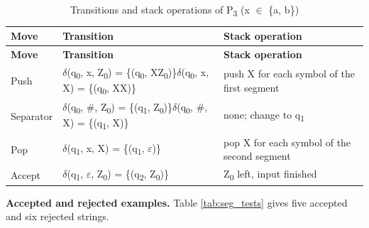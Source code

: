 \documentclass[12pt,a4paper]{article}
\begin{document}
{\footnotesize
\begin{longtable}{|>{\raggedright\arraybackslash}p{}|>{\raggedright\arraybackslash}p{}|>{\raggedright\arraybackslash}p{}|}
\caption[Transitions and stack operations of P3 (x \ensuremath{\in} \{a, b\})]{Transitions and stack operations of P\textsubscript{3} (x \ensuremath{\in} \{a, b\})}\label{tab:seg_delta}\\
\hline
\rowcolor{hdr}\textbf{Move} & \textbf{Transition} & \textbf{Stack operation}\\ \hline
\endfirsthead
\hline
\rowcolor{hdr}\textbf{Move} & \textbf{Transition} & \textbf{Stack operation}\\ \hline
\endhead
Push & \ensuremath{\delta}(q\textsubscript{0}, x, Z\textsubscript{0}) = \{(q\textsubscript{0}, XZ\textsubscript{0})\}\newline \ensuremath{\delta}(q\textsubscript{0}, x, X) = \{(q\textsubscript{0}, XX)\} & push X for each symbol of the first segment\\ \hline
Separator & \ensuremath{\delta}(q\textsubscript{0}, \#, Z\textsubscript{0}) = \{(q\textsubscript{1}, Z\textsubscript{0})\}\newline \ensuremath{\delta}(q\textsubscript{0}, \#, X) = \{(q\textsubscript{1}, X)\} & none; change to q\textsubscript{1}\\ \hline
Pop & \ensuremath{\delta}(q\textsubscript{1}, x, X) = \{(q\textsubscript{1}, \ensuremath{\varepsilon})\} & pop X for each symbol of the second segment\\ \hline
Accept & \ensuremath{\delta}(q\textsubscript{1}, \ensuremath{\varepsilon}, Z\textsubscript{0}) = \{(q\textsubscript{2}, Z\textsubscript{0})\} & Z\textsubscript{0} left, input finished\\ \hline
\end{longtable}}

\textbf{Accepted and rejected examples.} Table \ref{tab:seg_tests} gives five accepted and six rejected strings.
\end{document}
